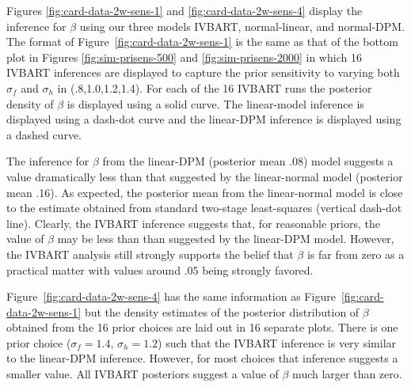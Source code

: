

Figures \ref{fig:card-data-2w-sens-1} and \ref{fig:card-data-2w-sens-4} display the inference
for $\beta$ using our three models IVBART, normal-linear, and normal-DPM.
The format of Figure~\ref{fig:card-data-2w-sens-1} is the same as that of 
the bottom plot in Figures \ref{fig:sim-prisens-500} and \ref{fig:sim-prisens-2000}
in which 16 IVBART inferences are displayed to capture the prior sensitivity to varying
both $\sigma_f$ and $\sigma_h$ in (.8,1.0,1.2,1.4).
For each of the 16 IVBART runs the posterior density of $\beta$ is displayed using a  solid curve.
The linear-model inference is displayed using a dash-dot curve and the linear-DPM inference is displayed
using a dashed curve.

The inference for $\beta$ from the linear-DPM (posterior mean .08)  
model suggests a value dramatically less than that suggested
by the linear-normal model (posterior mean .16).  
As expected, the posterior mean from  the linear-normal model is close to the estimate
obtained from standard two-stage least-squares (vertical dash-dot line).
Clearly, the IVBART inference suggests that, for reasonable priors, the value of $\beta$ may be less
than than suggested by the linear-DPM model.  However, the IVBART analysis still strongly supports the
belief that $\beta$ is far from zero as a practical matter with values around .05 being strongly favored.

Figure~\ref{fig:card-data-2w-sens-4} has the same information as Figure~\ref{fig:card-data-2w-sens-1}
but the density estimates of the posterior distribution of $\beta$ obtained from the 16 prior choices
are laid out in 16 separate plots.
There is one prior choice ($\sigma_f = 1.4$, $\sigma_h = 1.2$) such that the IVBART inference is very similar
to the linear-DPM inference.  However, for most choices that inference suggests a smaller value.
All IVBART posteriors suggest a value of $\beta$ much larger than zero.


